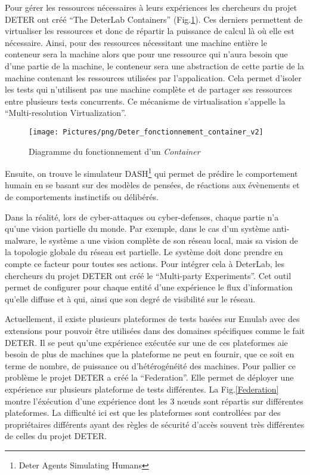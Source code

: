 Pour gérer les ressources nécessaires à leurs expériences les
chercheurs du projet DETER ont créé ``The DeterLab Containers''
(Fig.\ref{Conteneur}). Ces derniers permettent de virtualiser les
ressources et donc de répartir la puissance de calcul là où elle est
nécessaire. Ainsi, pour des ressources nécessitant une machine entière
le conteneur sera la machine alors que pour une ressource qui n'aura
besoin que d'une partie de la machine, le conteneur sera une
abstraction de cette partie de la machine contenant les ressources
utilisées par l'appalication. Cela permet d'isoler les tests qui
n'utilisent pas une machine complète et de partager ses ressources
entre plusieurs tests concurrents. Ce mécanisme de virtualisation
s'appelle la ``Multi-resolution Virtualization''.

\begin{figure}
  \centering \texttt{[image: Pictures/png/Deter\_fonctionnement\_container\_v2]}
  \caption{Diagramme du fonctionnement d'un \textit{Container}}
  \label{Conteneur}
\end{figure}

Ensuite, on trouve le simulateur DASH\footnote{Deter Agents Simulating Humans}
qui permet de prédire le comportement humain en se basant sur des modèles de
pensées, de réactions aux évènements et de comportements instinctifs ou
délibérés.

Dans la réalité, lors de cyber-attaques ou cyber-defenses, chaque
partie n'a qu'une vision partielle du monde. Par exemple, dans le cas
d'un système anti-malware, le système a une vision complète de son
réseau local, mais sa vision de la topologie globale du réseau est
partielle. Le système doit donc prendre en compte ce facteur pour
toutes ses actions. Pour intégrer cela à DeterLab, les chercheurs du
projet DETER ont créé le ``Multi-party Experiments''. Cet outil permet
de configurer pour chaque entité d'une expérience le flux
d'information qu'elle diffuse et à qui, ainsi que son degré de
visibilité sur le réseau.

Actuellement, il existe plusieurs plateformes de tests basées sur
Emulab avec des extensions pour pouvoir être utilisées dans des
domaines spécifiques comme le fait DETER. Il se peut qu'une expérience
exécutée sur une de ces plateformes aie besoin de plus de machines que
la plateforme ne peut en fournir, que ce soit en terme de nombre, de
puissance ou d'hétérogénéité des machines. Pour pallier ce problème le
projet DETER a créé la
``Federation''\citep{DETER_faber2007deter}. Elle permet de déployer
une expérience sur plusieurs plateforme de tests différentes. La
Fig.\ref{Federation} montre l'éxécution d'une expérience dont les 3
n\oe uds sont répartis sur différentes plateformes. La difficulté ici
est que les plateformes sont controllées par des propriétaires
différents ayant des règles de sécurité d'accès souvent très
différentes de celles du projet DETER.

